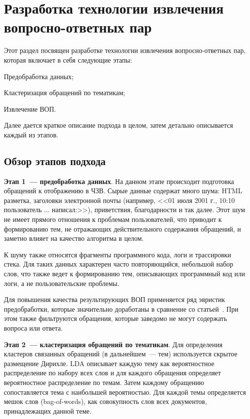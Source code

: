 \chapter{Разработка технологии извлечения вопросно-ответных пар}
\label{chap:dev}

Этот раздел посвящен разработке технологии извлечения вопросно-ответных пар, которая включает в себя следующие этапы:

\begin{itemize*}
\item Предобработка данных;
\item Кластеризация обращений по тематикам;
\item Извлечение ВОП.
\end{itemize*}

Далее дается краткое описание подхода в целом, затем детально описывается каждый из этапов.

\section{Обзор этапов подхода}
\label{sec:overview}

\textbf{Этап 1~--- предобработка данных}. На данном этапе происходит подготовка обращений к отображению в ЧЗВ. Сырые данные содержат много шума: HTML разметка, заголовки электронной почты (например, <<01 июля 2001 г., 10:10 пользователь ... написал:>>), приветствия, благодарности и так далее. Этот шум не имеет прямого отношения к проблемам пользователей, что приводит к формированию тем, не отражающих действительного содержания обращений, и заметно влияет на качество алгоритма в целом. 

К шуму также относятся фрагменты программного кода, логи и трассировки стека. Для таких данных характерен часто повторяющийся, небольшой набор слов, что также ведет к формированию тем, описывающих программный код или логи, а не пользовательские проблемы.

Для повышения качества результирующих ВОП применяется ряд эвристик предобработки, которые значительно доработаны в сравнение со статьей~\cite{original}. При этом также фильтруются обращения, которые заведомо не могут содержать вопроса или ответа. 

\textbf{Этап 2~--- кластеризация обращений по тематикам}. Для определения кластеров связанных обращений (в дальнейшем~--- тем) используется скрытое размещение Дирихле. LDA описывает каждую тему как вероятностное распределение по набору всех слов и для каждого обращения определяет вероятностное распределение по темам. Затем каждому обращению сопоставляется тема с наибольшей вероятностью. Для каждой темы определяется мешок слов (bag-of-words), как совокупность слов всех документов, принадлежащих данной теме. 

